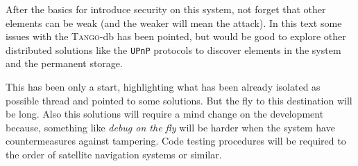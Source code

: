 \documentclass[10pt,a4paper,twoside]{llncs}
\newcommand{\tango}{\textsc{Tango}}
\begin{document}
After the basics for introduce security on this system, not forget that other elements can be weak (and the weaker will mean the attack). In this text some issues with the \tango-db has been pointed, but would be good to explore other distributed solutions like the {\tt UPnP} protocols to discover elements in the system and the permanent storage.

This has been only a start, highlighting what has been already isolated as possible thread and pointed to some solutions. But the fly to this destination will be long. Also this solutions will require a mind change on the development because, something like \emph{debug on the fly} will be harder when the system have countermeasures against tampering. Code testing procedures will be required to the order of satellite navigation systems or similar.



\end{document}
